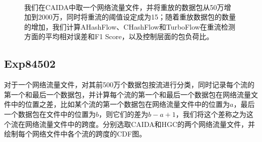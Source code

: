 \documentclass{article}
\begin{document}
\begin{figure}[ht!]
	\centering
	\mbox{
	}
	\mbox{
	}
	\caption{我们在CAIDA中取一个网络流量文件，并将重放的数据包从50万增加到2000万，同时将重流的阈值设定成为15；随着重放数据包的数量的增加，我们计算AHashFlow、CHashFlow和TurboFlow在重流检测方面的平均相对误差和F1 Score，以及控制层面的包负荷比。}
	\label{fig:hh_dection_various_pkt_number}
\end{figure}


\subsection{Exp84502}
对于一个网络流量文件，对其前500万个数据包按流进行分类，同时记录每个流的第一个和最后一个数据包，并计算每个流的第一个和最后一个数据包在网络流量文件中的位置之差，比如某个流的第一个数据包在网络流量文件中的位置为$a$，最后一个数据包在文件中的位置为$b$，则它们的差为$b-a+1$，我们将这个差称之为这个流在网络流量文件中的跨度。分别选取CAIDA和HGC的两个网络流量文件，并绘制每个网络文件中各个流的跨度的CDF图。
\end{document}
